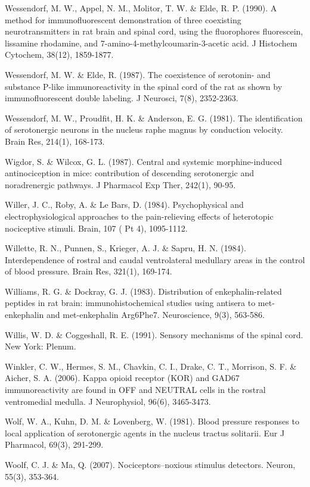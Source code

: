 \documentclass[a4paper,12pt,twoside]{report}
\begin{document}
\begin{singlespacing}
\begin{footnotesize}
Wessendorf, M. W., Appel, N. M., Molitor, T. W. \& Elde, R. P. (1990). A method for immunofluorescent demonstration of three coexisting neurotransmitters in rat brain and spinal cord, using the fluorophores fluorescein, lissamine rhodamine, and 7-amino-4-methylcoumarin-3-acetic acid. J Histochem Cytochem, 38(12), 1859-1877.

Wessendorf, M. W. \& Elde, R. (1987). The coexistence of serotonin- and substance P-like immunoreactivity in the spinal cord of the rat as shown by immunofluorescent double labeling. J Neurosci, 7(8), 2352-2363.

Wessendorf, M. W., Proudfit, H. K. \& Anderson, E. G. (1981). The identification of serotonergic neurons in the nucleus raphe magnus by conduction velocity. Brain Res, 214(1), 168-173.

Wigdor, S. \& Wilcox, G. L. (1987). Central and systemic morphine-induced antinociception in mice: contribution of descending serotonergic and noradrenergic pathways. J Pharmacol Exp Ther, 242(1), 90-95.

Willer, J. C., Roby, A. \& Le Bars, D. (1984). Psychophysical and electrophysiological approaches to the pain-relieving effects of heterotopic nociceptive stimuli. Brain, 107 ( Pt 4), 1095-1112.

Willette, R. N., Punnen, S., Krieger, A. J. \& Sapru, H. N. (1984). Interdependence of rostral and caudal ventrolateral medullary areas in the control of blood pressure. Brain Res, 321(1), 169-174.

Williams, R. G. \& Dockray, G. J. (1983). Distribution of enkephalin-related peptides in rat brain: immunohistochemical studies using antisera to met-enkephalin and met-enkephalin Arg6Phe7. Neuroscience, 9(3), 563-586.

Willis, W. D. \& Coggeshall, R. E. (1991). Sensory mechanisms of the spinal cord. New York: Plenum.

Winkler, C. W., Hermes, S. M., Chavkin, C. I., Drake, C. T., Morrison, S. F. \& Aicher, S. A. (2006). Kappa opioid receptor (KOR) and GAD67 immunoreactivity are found in OFF and NEUTRAL cells in the rostral ventromedial medulla. J Neurophysiol, 96(6), 3465-3473.

Wolf, W. A., Kuhn, D. M. \& Lovenberg, W. (1981). Blood pressure responses to local application of serotonergic agents in the nucleus tractus solitarii. Eur J Pharmacol, 69(3), 291-299.

Woolf, C. J. \& Ma, Q. (2007). Nociceptors--noxious stimulus detectors. Neuron, 55(3), 353-364.


\end{footnotesize}
\end{singlespacing}
\end{document}
